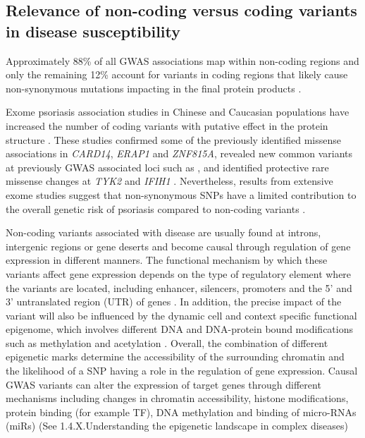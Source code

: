 \subsection{Relevance of non-coding versus coding variants in disease susceptibility}

Approximately 88\% of all GWAS associations map within non-coding regions and only the remaining 12\% account for variants in coding regions that likely cause non-synonymous mutations impacting in the final protein products \parencite{Welter2013}.

Exome psoriasis association studies in Chinese and Caucasian populations have increased the number of coding variants with putative effect in the protein structure \parencite{Tang2014,Zuo2015,Dand2017}. These studies confirmed some of the previously identified missense associations in \textit{CARD14}, \textit{ERAP1} and \textit{ZNF815A}, revealed new common variants at previously GWAS associated loci such as , and identified protective rare missense changes at \textit{TYK2} and \textit{IFIH1} \parencite{Tang2014,Dand2017}. Nevertheless, results from extensive exome studies suggest that non-synonymous SNPs have a limited contribution to the overall genetic risk of psoriasis compared to non-coding variants \parencite{Tang2014}.

Non-coding variants associated with disease are usually found at introns, intergenic regions or gene deserts and become causal through regulation of gene expression in different manners. The functional mechanism by which these variants affect gene expression depends on the type of regulatory element where the variants are located, including enhancer, silencers, promoters and the 5' and 3' untranslated region (UTR) of genes \parencite{Ward2012}. In addition, the precise impact of the variant will also be influenced by the dynamic cell and context specific functional epigenome, which involves different DNA and DNA-protein bound modifications such as methylation and acetylation \parencite{Feil2013}. Overall, the combination of different epigenetic marks determine the accessibility of the surrounding chromatin and the likelihood of a SNP having a role in the regulation of gene expression. Causal GWAS variants can alter the expression of target genes through different mechanisms including changes in chromatin accessibility, histone modifications, protein binding (for example TF), DNA methylation and binding of micro-RNAs (miRs) \parencite{Knight2014} (See 1.4.X.Understanding the epigenetic landscape in complex diseases)

